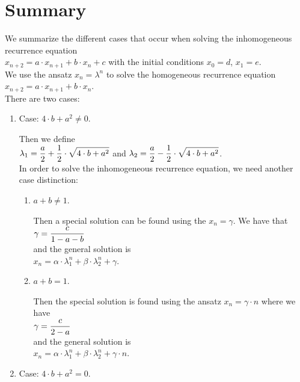 \section{Summary}
We summarize the different cases that occur when solving the inhomogeneous recurrence equation
\\[0.2cm]
\hspace*{1.3cm}
$x_{n+2} = a \cdot x_{n+1} + b \cdot x_n + c$ \quad with the initial  conditions \quad $x_0 = d$, $x_1 = e$.
\\[0.2cm]
We use the ansatz $x_n = \lambda^n$ to solve the homogeneous recurrence equation
\\[0.2cm]
\hspace*{1.3cm}
$x_{n+2} = a \cdot x_{n+1} + b \cdot x_n$.
\\[0.2cm]
There are two cases:
\begin{enumerate}
\item Case: $4 \cdot b + a^2 \not= 0$.

      Then we define
      \\[0.2cm]
      \hspace*{1.3cm}
      $\displaystyle\lambda_1 = \frac{a}{2} + \frac{1}{2} \cdot \sqrt{4 \cdot b + a^2}$ \quad and \quad
      $\displaystyle\lambda_2 = \frac{a}{2} - \frac{1}{2} \cdot \sqrt{4 \cdot b + a^2}$.
      \\[0.2cm]
      In order to solve the inhomogeneous recurrence equation, we need another case distinction:
      \begin{enumerate}
      \item $a + b \not= 1$.
        
            Then a special solution can be found using the   $x_n = \gamma$.
            We have that
            \\[0.2cm]
            \hspace*{1.3cm}
            $\displaystyle \gamma = \frac{c}{1 - a - b}$
            \\[0.2cm]
            and the general solution is
            \\[0.2cm]
            \hspace*{1.3cm}
            $x_n = \alpha \cdot \lambda_1^n + \beta \cdot \lambda_2^n + \gamma$.
      \item $a + b = 1$.

            Then the special solution is found using the ansatz $x_n = \gamma \cdot n$ where we have
            \\[0.2cm]
            \hspace*{1.3cm}
            $\displaystyle \gamma = \frac{c}{2 - a}$
            \\[0.2cm]
            and the general
            solution is
            \\[0.2cm]
            \hspace*{1.3cm}
            $x_n = \alpha \cdot \lambda_1^n + \beta \cdot \lambda_2^n + \gamma \cdot n$.
      \end{enumerate}
\item Case: $4 \cdot b + a^2 = 0$.


\end{enumerate}
